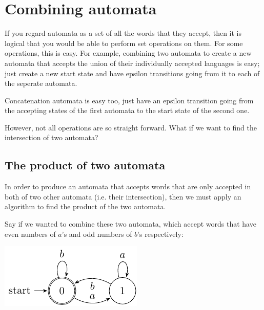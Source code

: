 
\section{Combining automata}

If you regard automata as a set of all the words that they accept, then it is
logical that you would be able to perform set operations on them. For some
operations, this is easy. For example, combining two automata to create a new
automata that accepts the union of their individually accepted languages is
easy; just create a new start state and have epsilon transitions going from it
to each of the seperate automata.

Concatenation automata is easy too, just have an epsilon transition going from
the accepting states of the first automata to the start state of the second one.

However, not all operations are so straight forward. What if we want to find the
intersection of two automata?

\subsection{The product of two automata}

In order to produce an automata that accepts words that are only accepted in
both of two other automata (i.e. their intersection), then we must apply an
algorithm to find the product of the two automata.

Say if we wanted to combine these two automata, which accept words that have
even numbers of $a$'s and odd numbers of $b$'s respectively:

\begin{center}
  \includegraphics{automata/28.pdf}
\end{center}


